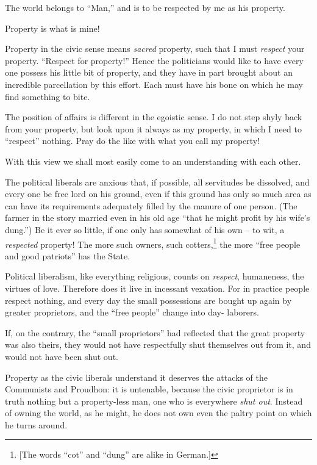 The world belongs to ``Man,'' and is to be respected by me as his property.

Property is what is mine!

Property in the civic sense means \textit{sacred} property, such that I must 
\textit{respect} your property. ``Respect for property!'' Hence the 
politicians would like to have every one possess his little bit of property, 
and they have in part brought about an incredible parcellation by this effort. 
Each must have his bone on which he may find something to bite.

The position of affairs is different in the egoistic sense. I do not step 
shyly back from your property, but look upon it always as my property, in 
which I need to ``respect'' nothing. Pray do the like with what you call my 
property!

With this view we shall most easily come to an understanding with each other.

The political liberals are anxious that, if possible, all servitudes be 
dissolved, and every one be free lord on his ground, even if this ground has 
only so much area as can have its requirements adequately filled by the manure 
of one person. (The farmer in the story married even in his old age ``that he 
might profit by his wife's dung.'') Be it ever so little, if one only has 
somewhat of his own -- to wit, a \textit{respected} property! The more such 
owners, such cotters,\footnote{[The words ``cot'' and ``dung'' are alike 
in German.]} the more ``free people and good patriots'' has the State.

Political liberalism, like everything religious, counts on \textit{respect}, 
humaneness, the virtues of love. Therefore does it live in incessant vexation. 
For in practice people respect nothing, and every day the small possessions 
are bought up again by greater proprietors, and the ``free people'' change 
into day- laborers.

If, on the contrary, the ``small proprietors'' had reflected that the great 
property was also theirs, they would not have respectfully shut themselves out 
from it, and would not have been shut out.

Property as the civic liberals understand it deserves the attacks of the 
Communists and Proudhon: it is untenable, because the civic proprietor is in 
truth nothing but a property-less man, one who is everywhere \textit{shut 
out}. Instead of owning the world, as he might, he does not own even the 
paltry point on which he turns around.

